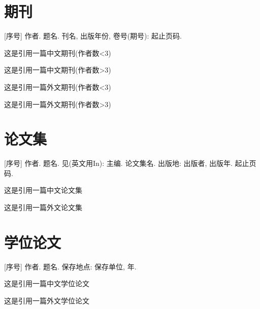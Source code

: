\documentclass[UTF8, a4paper, 12pt, AutoFakeBold]{ctexart} %
\begin{document}
\section{期刊}

[序号] 作者. 题名\nobreak[J]. 刊名, 出版年份, 卷号(期号): 起止页码. 

这是引用一篇中文期刊\cite{李静2021多语言}(作者数<3)

这是引用一篇中文期刊\cite{张德海2018基于}(作者数>3)

这是引用一篇外文期刊\cite{Deng2013ApplicationOE}(作者数<3)

这是引用一篇外文期刊\cite{you2022knowledge}(作者数>3)

\section{论文集}

[序号] 作者. 题名\nobreak[A]. 见(英文用In): 主编. 论文集名\nobreak[C]. 出版地: 出版者, 出版年. 起止页码.

这是引用一篇中文论文集\cite{封晨}

这是引用一篇外文论文集\cite{dong2014knowledge}

\section{学位论文}

[序号] 作者. 题名\nobreak[D]. 保存地点: 保存单位, 年.

这是引用一篇中文学位论文\cite{姚歆蕾2021基于}

这是引用一篇外文学位论文\cite{w2021e}

\end{document}
